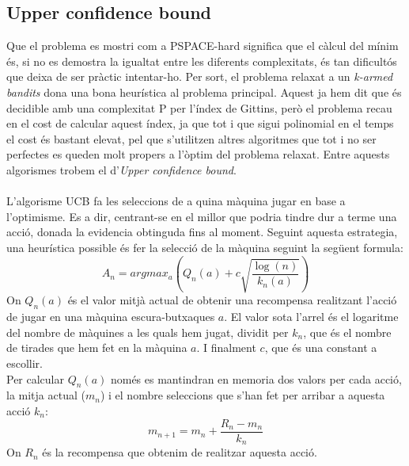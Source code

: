
	\subsection{Upper confidence bound}
	Que el problema es mostri com a PSPACE-hard significa que el càlcul del mínim és, si no es demostra la igualtat entre
	les diferents complexitats, és tan dificultós que deixa de ser pràctic intentar-ho. Per sort, el problema relaxat a un
	\textit{k-armed bandits} dona una bona heurística al problema principal. Aquest ja hem dit que és decidible amb una complexitat P
	 per l'índex de Gittins, però el problema recau en el cost de calcular aquest índex, ja que tot i que sigui polinomial en el temps
	el cost és bastant elevat, pel que s'utilitzen altres algoritmes que tot i no ser perfectes es queden molt propers a l'òptim del 
	problema relaxat. Entre aquests algorismes trobem el d'\textit{Upper confidence bound}. \\
	\\
	L'algorisme UCB fa les seleccions de a quina màquina jugar en base a l'optimisme. Es a dir, centrant-se en el millor que podria tindre dur a terme una acció, donada la evidencia obtinguda fins al moment.
	Seguint aquesta estrategia, una heurística possible és fer la selecció de la màquina seguint la següent formula:
	\[
	A_n = argmax_a(Q_n(a) + c\sqrt{\frac{\log (n)}{k_n(a)}})
	\]
	On $Q_n(a)$ és el valor mitjà actual de obtenir una recompensa realitzant l'acció de jugar en una màquina escura-butxaques $a$. 
	El valor sota l'arrel és el logaritme del nombre de màquines a les quals hem jugat, dividit per $k_n$, 
	que és el nombre de tirades que hem fet en la màquina $a$. I finalment $c$, que és una constant a escollir.\\
	 Per calcular $Q_n(a)$ només es mantindran en memoria dos valors per cada acció, la 
	mitja actual ($m_n$) i  el nombre seleccions que s'han fet per arribar a aquesta acció $k_n$: %
	\[
	m_{n+1} = m_n + \frac{R_n - m_n}{k_n}
	\]
	On $R_n$ és la recompensa que obtenim de realitzar aquesta acció.
	
